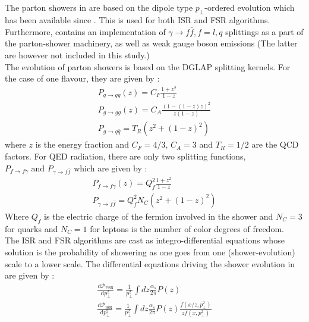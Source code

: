 \subsection{\Pythia}
\label{sec:psunc:tools:pythia}
The parton showers in  are based on the dipole type $p_\perp$-ordered
evolution which has been available since  \cite{Sjostrand:2004ef}. 
This is used for both ISR and FSR algorithms. Furthermore,  \cite{Sjostrand:2007gs,Sjostrand:2014zea}
contains an implementation of $\gamma \to f \bar{f}, f = l,q$ splittings 
as a part of the parton-shower machinery, as well as weak gauge boson emissions \cite{Christiansen:2014kba}
(The latter are however not included in this study.) \\
The evolution of parton showers is based on the DGLAP splitting kernels. For the case of one flavour, they are
given by :
\begin{eqnarray}
 P_{q \to q g} (z) = C_F \frac{1 + z^2}{1 - z} \\
 P_{g \to g g} (z) = C_A \frac{(1 - (1 - z) z)^2}{z (1-z)} \\
 P_{g \to q \bar{q}} = T_R (z^2 + (1 - z)^2)
\end{eqnarray}
where $z$ is the energy fraction and $C_F = 4/3$, $C_A = 3$
and $T_R=1/2$ are the QCD factors. For QED radiation, there are only 
two splitting functions, $P_{f\to f \gamma} \text{ and } P_{\gamma \to f\bar{f}}$ which are given by :
\begin{eqnarray}
 P_{f \to f \gamma} (z) = Q_f^2 \frac{1 + z^2}{1 - z} \\
 P_{\gamma \to f \bar{f}} = Q_f^2 N_C (z^2 + (1 - z)^2)
\end{eqnarray}
Where $Q_f$ is the electric charge of the fermion involved in the shower 
and $N_C = 3$ for quarks and $N_C=1$ for leptons is the number of color degrees 
of freedom. \\
The ISR and FSR algorithms are cast as integro-differential equations whose solution
is the probability of showering as one goes from one (shower-evolution) scale to a lower scale. 
The differential equations driving the shower evolution 
in \Pythia \quad are given by :
\begin{eqnarray}
 \frac{\text{d} \mathcal{P}_{\text{FSR}}}{\text{d} p_\perp^2} = \frac{1}{p_\perp^2} \int dz \frac{\alpha_s}{2 \pi} P(z) \\
 \frac{\text{d} \mathcal{P}_{\text{ISR}}}{\text{d} p_\perp^2} = \frac{1}{p_\perp^2} \int dz \frac{\alpha_s}{2 \pi} P(z) 
 \frac{f(x/z,p_\perp^2)}{z f(x,p_\perp^2)}
\end{eqnarray}
